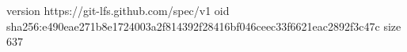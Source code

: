 version https://git-lfs.github.com/spec/v1
oid sha256:e490eae271b8e1724003a2f814392f28416bf046ceec33f6621eac2892f3c47c
size 637
